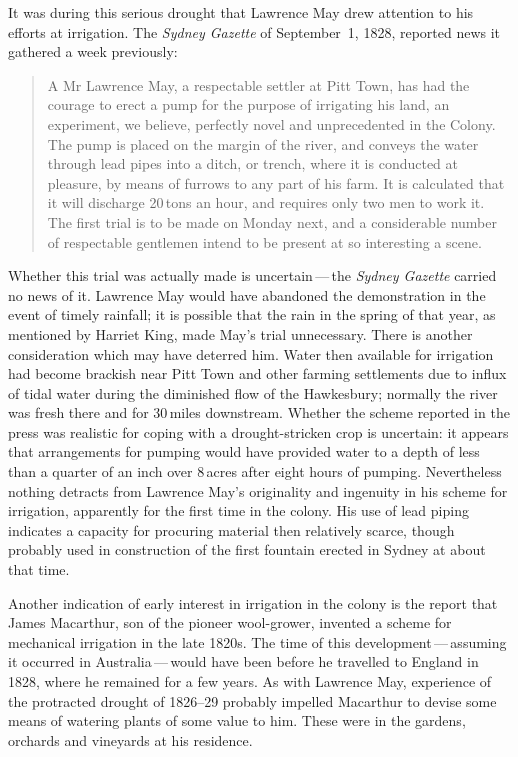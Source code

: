 It was during this serious drought that Lawrence May drew attention to
his efforts at irrigation.  The \textsl{Sydney Gaz\-ette} of
September~1, 1828, reported news it gathered a week previously:
\begin{quote}
	A Mr Lawrence May, a respectable settler at Pitt Town, has had
	the courage to erect a pump for the purpose of irrigating his
	land, an experiment, we believe, perfectly novel and
	unprecedented in the Colony. The pump is placed on the margin
	of the river, and conveys the water through lead pipes into a
	ditch, or trench, where it is conducted at pleasure, by means
	of furrows to any part of his farm. It is calculated that it
	will discharge 20\,tons an hour, and requires only two men to
	work it. The first trial is to be made on Monday next, and a
	considerable number of respectable gentlemen intend to be
	present at so interesting a scene.
\end{quote}

Whether this trial was actually made is uncertain\,---\,the
\textsl{Sydney Gaz\-ette} carried no news of it.  Lawrence May would
have abandoned the demonstration in the event of timely rainfall; it
is possible that the rain in the spring of that year, as mentioned by
Harriet King, made May's trial unnecessary.  There is another
consideration which may have deterred him.  Water then available for
irrigation had become brackish near Pitt Town and other farming
settlements due to influx of tidal water during the diminished flow of
the Hawkesbury; normally the river was fresh there and for 30\,miles
downstream.  Whether the
scheme reported in the press was realistic for coping with a
drought-stricken crop is uncertain: it appears that arrangements for
pumping would have provided water to a depth of less than a quarter of
an inch over 8\,acres after eight hours of pumping.  Nevertheless
nothing detracts from Lawrence May's originality and ingenuity in his
scheme for irrigation, apparently for the first time in the colony.
His use of lead piping indicates a capacity for procuring material
then relatively scarce, though probably used in construction of the
first fountain erected in Sydney at about that time.

Another indication of early interest in irrigation in the colony is
the report that James Mac\-ar\-th\-ur, son of the
pioneer wool-grower, invented a scheme for mechanical irrigation in
the late 1820s.  The time of this development\,---\,assuming it occurred
in Australia\,---\,would have been before he travelled to England in
1828, where he remained for a few years.  As with Lawrence May,
experience of the protracted drought of 1826--29 probably impelled
Macarthur to devise some means of watering plants of some value to
him.  These were in the gardens, orchards and vineyards at his
residence.

